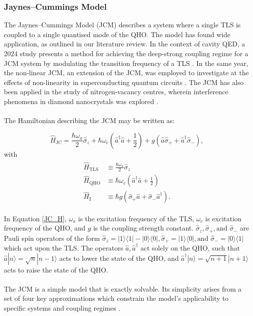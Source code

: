 \documentclass[12pt]{article}
\begin{document}
\subsubsection{Jaynes--Cummings Model} \label{sec:theory_subsub_JCM}

The Jaynes--Cummings Model (JCM) describes a system where a single TLS is coupled to a single quantised mode of the QHO. The model has found wide application, as outlined in our literature review. In the context of cavity QED, a 2024 study presents a method for achieving the deep-strong coupling regime for a JCM system by modulating the transition frequency of a TLS \cite{Context2024-CQED_JCM}. In the same year, the non-linear JCM, an extension of the JCM, was employed to investigate at the effects of non-linearity in superconducting quantum circuits \cite{Context2024-CircuitQED}. The JCM has also been applied in the study of nitrogen-vacancy centres, wherein interference phenomena in diamond nanocrystals was explored \cite{Context2009-Alt_NVcentres}. \\
\\
The Hamiltonian describing the JCM may be written as:

\begin{equation} \label{JC_H}
    \hat{H}_{\scriptscriptstyle \text{JC}} = \frac{\hbar\omega_a}{2}\hat{\sigma}_z + \hbar\omega_c\left(\hat{a}^\dagger \hat{a} + \frac{1}{2} \right) + g(\hat{a}\hat{\sigma}_{+} + \hat{a}^\dagger\hat{\sigma}_{-}), 
\end{equation} 
with 
\begin{align*}
    \begin{aligned}
        \hat{H}_{\scriptscriptstyle \text{TLS}} &\equiv \frac{\hbar\omega_a}{2}\hat{\sigma}_z \\
        \hat{H}_{\scriptscriptstyle \text{QHO}} &\equiv \hbar\omega_c\left(\hat{a}^\dagger \hat{a} + \frac{1}{2} \right) \\
        \hat{H}_{\scriptscriptstyle \text{I}} &\equiv \hbar g(\hat{\sigma}_{+}\hat{a} +\hat{\sigma}_{-}\hat{a}^\dagger).
    \end{aligned}
\end{align*}

In Equation \eqref{JC_H}, $\omega_a$ is the excitation frequency of the TLS, $\omega_c$ is excitation frequency of the QHO, and $g$ is the coupling strength constant. $\hat{\sigma}_z, \hat{\sigma}_+, \text{and } \hat{\sigma}_-$ are Pauli spin operators of the form $\hat{\sigma}_z = |1\rangle\langle1| - |0\rangle\langle0|, \hat{\sigma}_+ = |1\rangle\langle0|, \text{and } \hat{\sigma}_- = |0\rangle\langle1|$ which act upon the TLS. The operators $\hat{a}, \hat{a}^\dagger$ act solely on the QHO, such that $\hat{a}|n\rangle = \sqrt{n}|n-1\rangle$ acts to lower the state of the QHO, and $\hat{a}^{\dagger}|n\rangle = \sqrt{n+1}|n+1\rangle$ acts to raise the state of the QHO.\\
\\
The JCM is a simple model that is exactly solvable. Its simplicity arises from a set of four key approximations which constrain the model’s applicability to specific systems and coupling regimes \cite{General2024-JC_overview}. 
\end{document}
